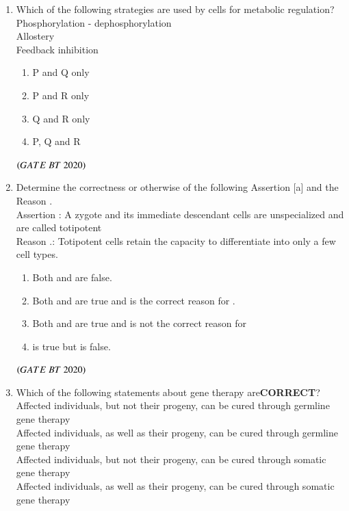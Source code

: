 \documentclass[journal,12pt,onecolumn]{IEEEtran}
\theoremstyle{remark}
\begin{document}
\begin{enumerate}[label=Q\arabic*:]
\begin{enumerate}[label=Q\arabic*:, start=26, leftmargin=2em]
\item Which of the following strategies are used by cells for metabolic regulation?\\
Phosphorylation - dephosphorylation\\
 Allostery\\
 Feedback inhibition\\
\begin{multicols}{2}
\begin{enumerate}[label=\alph*)]

\item P and Q only
\item P and R only
\item Q and R only
\item P, Q and R 

\end{enumerate}
\end{multicols}
\hfill$\left(GATE\ BT\ 2020\right)$

\item Determine the correctness or otherwise of the following Assertion [a] and the Reason .\\
Assertion : A zygote and its immediate descendant cells are unspecialized and are called totipotent\\
Reason .: Totipotent cells retain the capacity to differentiate into only a few cell types.

\begin{enumerate}[label=\alph*)]

\item\; Both  and  are false.
\item\; Both and  are true and is the correct reason for .
\item\; Both  and  are true and is not the correct reason for 
\item\;  is true but is  false.

\end{enumerate} 

\hfill$\left(GATE\ BT\ 2020\right)$

\item Which of the following statements about gene therapy are\textbf{CORRECT}?\\
Affected individuals, but not their progeny, can be cured through germline gene therapy\\
Affected individuals, as well as their progeny, can be cured through germline gene therapy\\
Affected individuals, but not their progeny, can be cured through somatic gene therapy\\Affected individuals, as well as their progeny, can be cured through somatic gene therapy


\end{enumerate}
\end{enumerate}
\end{document}
